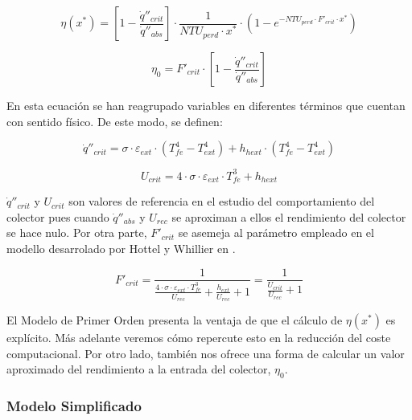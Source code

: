 \begin{equation}
    \eta(x^{*}) = \left[1-\frac{\dot q''_{crit}}{\dot q''_{abs}}\right] \cdot \frac{1}{NTU_{perd} \cdot x^{*}} \cdot \left(1-e^{-NTU_{perd}\cdot F'_{crit}\cdot x^{*}}\right) 
    \label{eq:primerorden}
\end{equation}

\begin{equation}
    \eta_{0} = F'_{crit} \cdot \left[1-\frac{\dot q''_{crit}}{\dot q''_{abs}}\right] 
    \label{eq:rendimiento0aproximado}
\end{equation}

En esta ecuación se han reagrupado variables en diferentes términos que
cuentan con sentido físico. De este modo, se definen:

\begin{equation}
    \dot q''_{crit} = \sigma \cdot \varepsilon_{ext} \cdot \left(T^{4}_{fe}- T^{4}_{ext}\right)+h_{hext} \cdot \left(T^{4}_{fe}- T^{4}_{ext}\right)
    \label{eq:qcrit}
\end{equation}

\begin{equation}
    U_{crit} = 4 \cdot \sigma \cdot \varepsilon_{ext} \cdot T^{3}_{fe} + h_{hext}
    \label{eq:ucrit}
\end{equation}

\(\dot q''_{crit}\) y \(U_{crit}\) son valores de referencia en el
estudio del comportamiento del colector pues cuando \(\dot q''_{abs}\) y
\(U_{rec}\) se aproximan a ellos el rendimiento del colector se hace
nulo. Por otra parte, \(F'_{crit}\) se asemeja al parámetro empleado en
el modello desarrolado por Hottel y Whillier en \cite{1022085/DVRL97SH}.

\begin{equation}
    F'_{crit} = \frac{1}{\frac{4 \cdot \sigma \cdot \varepsilon_{ext} \cdot T^{3}_{fe}}{U_{rec}} + \frac{h_{ext}}{U_{rec}} +1} = \frac{1}{\frac{U_{crit}}{U_{rec}}+1}
    \label{eq:fcrit}
\end{equation}

El Modelo de Primer Orden presenta la ventaja de que el cálculo de
\(\eta(x^{*})\) es explícito. Más adelante veremos cómo repercute esto
en la reducción del coste computacional. Por otro lado, también nos
ofrece una forma de calcular un valor aproximado del rendimiento a la
entrada del colector, \(\eta_{0}\).

\hypertarget{modelo-simplificado}{%
\subsubsection{Modelo Simplificado}\label{modelo-simplificado}}

